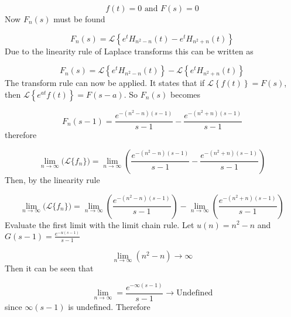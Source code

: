 \documentclass[a4paper,10pt,reqno]{amsart}
\numberwithin{equation}{section}
\newcommand{\lap}{\mathscr{L}}
\begin{document}
\begin{equation}
     f(t) = 0 \text{ and } F(s) = 0 \label{eq:F}
\end{equation}
\vspace{1pt}
Now $F_n(s)$ must be found

\begin{equation}
     F_n(s) = \lap\left\{e^t H_{n^2 - n}(t) - e^t H_{n^2 + n}(t)\right\}
\end{equation}
\vspace{1pt}
Due to the linearity rule of Laplace transforms this can be written as

\begin{equation}
     F_n(s) = \lap\left\{e^t H_{n^2 - n}(t)\right\} - \lap\left\{e^t H_{n^2 + n}(t)\right\}
\end{equation}
\vspace{1pt}
The transform rule can now be applied. It states that if $\lap\left\{f(t)\right\} = F(s)$, then $\lap\left\{e^{at} f(t)\right\} = F(s - a)$. So $F_n(s)$ becomes

\begin{equation}
     F_n(s - 1) = \frac{e^{-(n^2 - n)(s-1)}}{s-1} - \frac{e^{-(n^2 + n)(s-1)}}{s-1}
\end{equation}
\vspace{1pt}
therefore

\begin{equation}
     \lim_{n \to \infty} \big(\lap\{f_n\}\big) = \lim_{n \to \infty} \left(\frac{e^{-(n^2 - n)(s-1)}}{s-1} - \frac{e^{-(n^2 + n)(s-1)}}{s-1}\right)
\end{equation}
\vspace{1pt}
Then, by the linearity rule

\begin{equation}
     \lim_{n \to \infty} \big(\lap\{f_n\}\big) = \lim_{n \to \infty} \left(\frac{e^{-(n^2 - n)(s-1)}}{s-1}\right) - \lim_{n \to \infty}\left(\frac{e^{-(n^2 + n)(s-1)}}{s-1}\right)
\end{equation}
\vspace{1pt}
Evaluate the first limit with the limit chain rule. Let $u(n) = n^2 - n$ and $G(s - 1) = \frac{e^{-u(s - 1)}}{s - 1}$

\begin{equation}
     \lim_{n \to \infty} (n^2 - n) \to \infty
\end{equation}
\vspace{1pt}
Then it can be seen that

\begin{equation}
     \lim_{n \to \infty} = \frac{e^{-\infty(s - 1)}}{s - 1} \to \text{Undefined}
\end{equation}
\vspace{1pt}
since $\infty(s - 1)$ is undefined. Therefore
\end{document}

